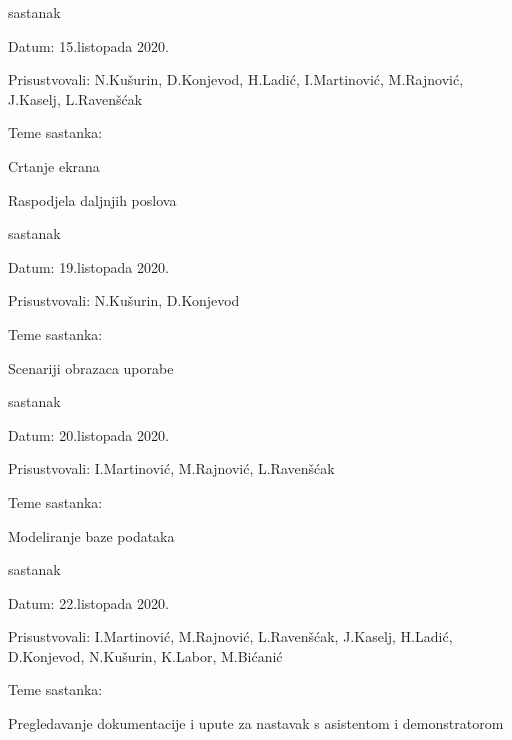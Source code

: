 \begin{packed_enum}
	\item sastanak
	\item[] \begin{packed_item}
		\item Datum: 15.listopada 2020.
		\item Prisustvovali: N.Kušurin, D.Konjevod, H.Ladić, I.Martinović, M.Rajnović, J.Kaselj, L.Ravenšćak
		\item Teme sastanka: 
		\begin{packed_item}
			\item   Crtanje ekrana
			\item 	Raspodjela daljnjih poslova
		\end{packed_item}
	\end{packed_item}

	\item sastanak
	\item[] \begin{packed_item}
		\item Datum:  19.listopada 2020.
		\item Prisustvovali: N.Kušurin, D.Konjevod
		\item Teme sastanka: 
		\begin{packed_item}
			\item   Scenariji obrazaca uporabe
		\end{packed_item}
	\end{packed_item}
	
	
	\item sastanak
	\item[] \begin{packed_item}
		\item Datum: 20.listopada 2020.
		\item Prisustvovali: I.Martinović, M.Rajnović, L.Ravenšćak
		\item Teme sastanka: 
		\begin{packed_item}
			\item   Modeliranje baze podataka
		\end{packed_item}
	\end{packed_item}
			
			
			\item sastanak
			\item[] \begin{packed_item}
				\item Datum: 22.listopada 2020.
				\item Prisustvovali: I.Martinović, M.Rajnović, L.Ravenšćak, J.Kaselj, H.Ladić, D.Konjevod, N.Kušurin, K.Labor, M.Bićanić
				\item Teme sastanka: 
				\begin{packed_item}
					\item   Pregledavanje dokumentacije i upute za nastavak s asistentom i demonstratorom
				\end{packed_item}
			\end{packed_item}
			

\end{packed_enum}
